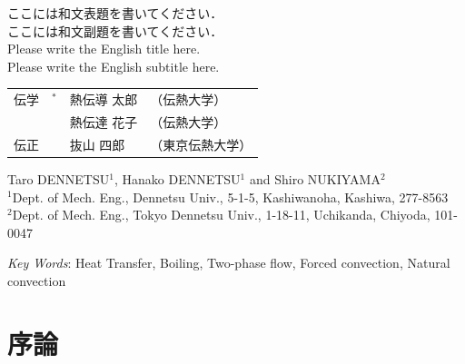 \documentclass[
    paper=a4paper,      %
    article,            %
    fleqn,              %
    fontsize=10pt,      %
    jafontsize=10pt,    %
    head_space=20mm,    %
    foot_space=25mm,    %
    gutter=20mm,        %
    fore-edge=20mm      %
    ]{jlreq}            %
\begin{document}
\thispagestyle{nhts}

\begin{center}
    \fontsize{14pt}{18pt}\selectfont
    {\gtfamily
    ここには和文表題を書いてください．
    }\\\fontsize{12pt}{14pt}\selectfont
    {\gtfamily
    ここには和文副題を書いてください．
    }\\
    Please write the English title here.
    \\
    Please write the English subtitle here.
    \vskip12pt\fontsize{10pt}{12pt}\selectfont
    \begin{tabular}{lrll}
      伝学  &$^\ast$\hspace{-3mm} &熱伝導 太郎  &（伝熱大学）\\
        & &熱伝達 花子  &（伝熱大学）\\
      伝正  & &抜山 四郎  &（東京伝熱大学）
    \end{tabular}
    \vskip12pt
    Taro DENNETSU$^1$, Hanako DENNETSU$^1$ and Shiro NUKIYAMA$^2$
    \\
    $^1$Dept. of Mech. Eng., Dennetsu Univ., 5-1-5, Kashiwanoha, Kashiwa, 277-8563 \\
    $^2$Dept. of Mech. Eng., Tokyo Dennetsu Univ., 1-18-11, Uchikanda, Chiyoda, 101-0047
    \vskip12pt
\end{center}
{\setlength{\leftskip}{\leftskip+15truemm}\setlength{\rightskip}{\rightskip+15truemm}%
\lipsum[1-2]
\par}%
\begin{center}
    \vskip12pt
    \textit{Key Words}: 
    Heat Transfer, Boiling, Two-phase flow, Forced convection, Natural convection
    \vskip12pt
\end{center}

\section{序論}

\end{document}
